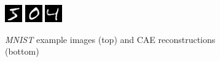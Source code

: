 \documentclass{article}
\begin{document}
\begin{figure}
\begin{subfigure}{0.45\linewidth}
      \includegraphics[width=0.3\linewidth]{../graphics/reconstructions/mnist/reconstruction_00.png}
      \includegraphics[width=0.3\linewidth]{../graphics/reconstructions/mnist/reconstruction_01.png}
      \includegraphics[width=0.3\linewidth]{../graphics/reconstructions/mnist/reconstruction_02.png}

      \caption{\emph{MNIST} example images (top) and CAE reconstructions (bottom)}
      \label{fig:mnist_reconstructions}

      \end{subfigure}
      \begin{subfigure}{0.45\linewidth}
        

\end{subfigure}
\end{figure}
\end{document}

